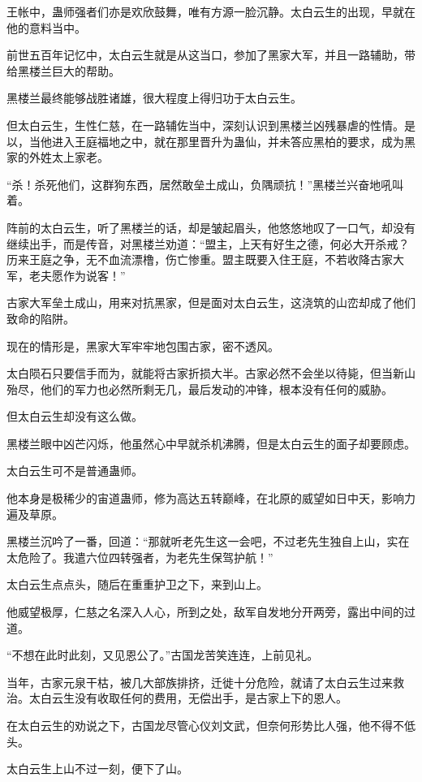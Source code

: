 \begin{this_body}
王帐中，蛊师强者们亦是欢欣鼓舞，唯有方源一脸沉静。太白云生的出现，早就在他的意料当中。

前世五百年记忆中，太白云生就是从这当口，参加了黑家大军，并且一路辅助，带给黑楼兰巨大的帮助。

黑楼兰最终能够战胜诸雄，很大程度上得归功于太白云生。

但太白云生，生性仁慈，在一路辅佐当中，深刻认识到黑楼兰凶残暴虐的性情。是以，当他进入王庭福地之中，就在那里晋升为蛊仙，并未答应黑柏的要求，成为黑家的外姓太上家老。

“杀！杀死他们，这群狗东西，居然敢垒土成山，负隅顽抗！”黑楼兰兴奋地吼叫着。

阵前的太白云生，听了黑楼兰的话，却是皱起眉头，他悠悠地叹了一口气，却没有继续出手，而是传音，对黑楼兰劝道：“盟主，上天有好生之德，何必大开杀戒？历来王庭之争，无不血流漂橹，伤亡惨重。盟主既要入住王庭，不若收降古家大军，老夫愿作为说客！”

古家大军垒土成山，用来对抗黑家，但是面对太白云生，这浇筑的山峦却成了他们致命的陷阱。

现在的情形是，黑家大军牢牢地包围古家，密不透风。

太白陨石只要信手而为，就能将古家折损大半。古家必然不会坐以待毙，但当新山殆尽，他们的军力也必然所剩无几，最后发动的冲锋，根本没有任何的威胁。

但太白云生却没有这么做。

黑楼兰眼中凶芒闪烁，他虽然心中早就杀机沸腾，但是太白云生的面子却要顾虑。

太白云生可不是普通蛊师。

他本身是极稀少的宙道蛊师，修为高达五转巅峰，在北原的威望如日中天，影响力遍及草原。

黑楼兰沉吟了一番，回道：“那就听老先生这一会吧，不过老先生独自上山，实在太危险了。我遣六位四转强者，为老先生保驾护航！”

太白云生点点头，随后在重重护卫之下，来到山上。

他威望极厚，仁慈之名深入人心，所到之处，敌军自发地分开两旁，露出中间的过道。

“不想在此时此刻，又见恩公了。”古国龙苦笑连连，上前见礼。

当年，古家元泉干枯，被几大部族排挤，迁徙十分危险，就请了太白云生过来救治。太白云生没有收取任何的费用，无偿出手，是古家上下的恩人。

在太白云生的劝说之下，古国龙尽管心仪刘文武，但奈何形势比人强，他不得不低头。

太白云生上山不过一刻，便下了山。


\end{this_body}
